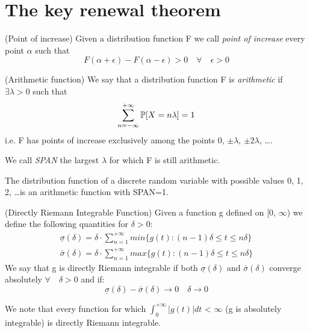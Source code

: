 \section{The key renewal theorem}
\begin{definition}
	(Point of increase) Given a distribution function F we call \textit{point of increase} every point $\alpha$ such that
	\begin{equation}
		F(\alpha+\epsilon)-F(\alpha-\epsilon)>0 \quad  \forall \quad
		\epsilon > 0
	\end{equation}
\end{definition}
\begin{definition}
	(Arithmetic function) We say that a distribution function F is \textit{arithmetic} if $\exists \lambda > 0$ such that
	\begin{equation}
		\sum_{n=-\infty}^{+\infty}\mathbb{P}[X = n\lambda] = 1
	\end{equation}
	i.e. F has points of increase exclusively among the points 0, $\pm \lambda$, $\pm 2\lambda$, \dots .

	We call \textit{SPAN} the largest $\lambda$ for which F is still arithmetic.
\end{definition}

The distribution function of a discrete random variable with possible values 0, 1, 2, \dots is an arithmetic function with SPAN=1.

\begin{definition}
	(Directly Riemann Integrable Function) Given a function g defined on [0, $\infty$) we define the following quantities for $\delta > 0$:
	\begin{align*}
		\underline \sigma (\delta) = \delta \cdot \sum_{n=1}^{+\infty} min\{g(t):(n-1)\delta \leq t \leq n \delta \}
		\\
		\bar \sigma (\delta) = \delta \cdot \sum_{n=1}^{+\infty}max\{g(t):(n-1)\delta \leq t \leq n \delta \}
	\end{align*}
	We say that g is directly Riemann integrable if both $\underline \sigma (\delta)$ and $\bar \sigma (\delta)$ converge absolutely $\forall \quad \delta > 0$ and if:
	\begin{equation}
		\underline \sigma (\delta) - \bar \sigma (\delta) \rightarrow 0 \quad \delta \rightarrow 0
		\end{equation}
\end{definition}

We note that every function for which $\int_{0}^{+\infty} |g(t)| dt$ < $\infty$ (g is absolutely integrable) is directly Riemann integrable.

